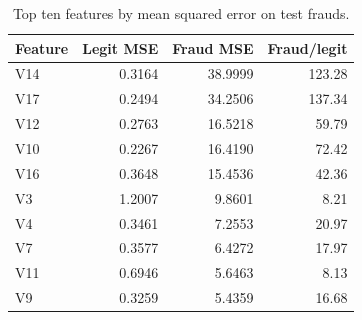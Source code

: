 \begin{table}[H]
\centering\footnotesize\setlength{\tabcolsep}{3pt}
\caption{Top ten features by mean squared error on test frauds.}
\label{tab:attribution}
\begin{tabular}{lrrr}
\toprule
Feature & Legit MSE & Fraud MSE & Fraud/legit \\
\midrule
V14 & 0.3164 & 38.9999 & 123.28 \\
V17 & 0.2494 & 34.2506 & 137.34 \\
V12 & 0.2763 & 16.5218 & 59.79 \\
V10 & 0.2267 & 16.4190 & 72.42 \\
V16 & 0.3648 & 15.4536 & 42.36 \\
V3 & 1.2007 & 9.8601 & 8.21 \\
V4 & 0.3461 & 7.2553 & 20.97 \\
V7 & 0.3577 & 6.4272 & 17.97 \\
V11 & 0.6946 & 5.6463 & 8.13 \\
V9 & 0.3259 & 5.4359 & 16.68 \\
\bottomrule
\end{tabular}
\end{table}
